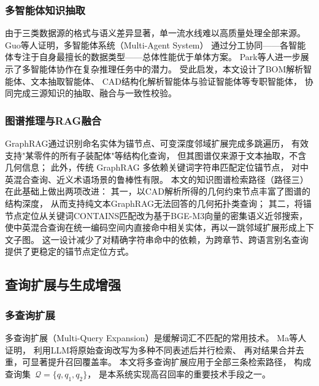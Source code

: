 \subsubsection{多智能体知识抽取}

由于三类数据源的格式与语义差异显著，单一流水线难以高质量处理全部来源。
Guo等人\cite{guo2024multiagent}证明，多智能体系统（Multi-Agent System）
通过分工协同——各智能体专注于自身最擅长的数据类型——总体性能优于单体方案。
Park等人\cite{park2023generative}进一步展示了多智能体协作在复杂推理任务中的潜力。
受此启发，本文设计了BOM解析智能体、文本抽取智能体、
CAD结构化解析智能体与验证智能体等专职智能体，
协同完成三源知识的抽取、融合与一致性校验。

\subsubsection{图谱推理与RAG融合}

GraphRAG\cite{edge2024graphrag}通过识别命名实体为锚节点、可变深度邻域扩展完成多跳遍历，
有效支持"某零件的所有子装配体"等结构化查询，
但其图谱仅来源于文本抽取，不含几何信息；
此外，传统 GraphRAG 多依赖关键词字符串匹配定位锚节点，
对中英混合查询、近义术语场景的鲁棒性有限。
本文的知识图谱检索路径（路径三）在此基础上做出两项改进：
其一，以CAD解析所得的几何约束节点丰富了图谱的结构深度，
从而支持纯文本GraphRAG无法回答的几何拓扑类查询；
其二，将锚节点定位从关键词CONTAINS匹配改为基于BGE-M3向量的密集语义近邻搜索，
使中英混合查询在统一编码空间内直接命中相关实体，再以一跳邻域扩展形成上下文子图。
这一设计减少了对精确字符串命中的依赖，为跨章节、跨语言别名查询提供了更稳定的锚节点定位方式。

\subsection{查询扩展与生成增强}
\label{sec:related-generation}

\subsubsection{多查询扩展}

多查询扩展（Multi-Query Expansion）是缓解词汇不匹配的常用技术。
Ma等人\cite{ma2023query}证明，
利用LLM将原始查询改写为多种不同表述后并行检索、
再对结果合并去重，可显著提升召回覆盖率。
本文将多查询扩展应用于全部三条检索路径，
构成查询集~$\mathcal{Q} = \{q, q_1, q_2\}$，
是本系统实现高召回率的重要技术手段之一。

